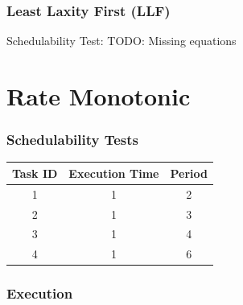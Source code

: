 \documentclass[xcolor=table]{beamer}
\begin{document}
\begin{frame}
\frametitle{Least Laxity First (\textbf{LLF})}

\begin{block}{Schedulability Test:}
TODO: Missing equations
\end{block}

\end{frame}
\section{Rate Monotonic}
\begin{frame}
\frametitle{Schedulability Tests}
\begin{table}[]
\begin{tabular}{|c|c|c|}
\hline
\textbf{Task ID} & \textbf{Execution Time} & \textbf{Period}\\ \hline
\cellcolor[HTML]{ECF6CE}1 &\cellcolor[HTML]{ECF6CE}1 &\cellcolor[HTML]{ECF6CE}2 \\ \hline
\cellcolor[HTML]{A4A4A4}2 &\cellcolor[HTML]{A4A4A4}1 &\cellcolor[HTML]{A4A4A4}3 \\ \hline
\cellcolor[HTML]{F781D8}3 &\cellcolor[HTML]{F781D8}1 &\cellcolor[HTML]{F781D8}4 \\ \hline
\cellcolor[HTML]{8181F7}4 &\cellcolor[HTML]{8181F7}1 &\cellcolor[HTML]{8181F7}6 \\ \hline
\end{tabular}
\end{table}
\end{frame}
\begin{frame}
\frametitle{Execution}
\begin{table}[]
\end{table}
\end{frame}
\end{document}
